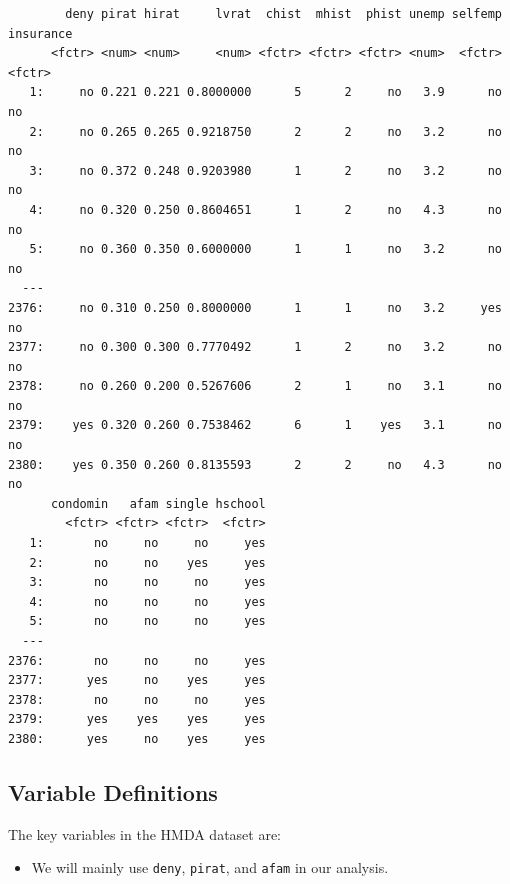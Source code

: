 \documentclass[
  12pt,
  letterpaper,
]{scrbook}
\providecommand{\tightlist}{%
  \setlength{\itemsep}{0pt}\setlength{\parskip}{0pt}}
\renewcommand{\tightlist}{\setlength{\itemsep}{0.5\baselineskip}\setlength{\parskip}{0.2\baselineskip}}
\theoremstyle{plain}
\theoremstyle{definition}
\theoremstyle{remark}
\begin{document}
\begin{verbatim}
        deny pirat hirat     lvrat  chist  mhist  phist unemp selfemp insurance
      <fctr> <num> <num>     <num> <fctr> <fctr> <fctr> <num>  <fctr>    <fctr>
   1:     no 0.221 0.221 0.8000000      5      2     no   3.9      no        no
   2:     no 0.265 0.265 0.9218750      2      2     no   3.2      no        no
   3:     no 0.372 0.248 0.9203980      1      2     no   3.2      no        no
   4:     no 0.320 0.250 0.8604651      1      2     no   4.3      no        no
   5:     no 0.360 0.350 0.6000000      1      1     no   3.2      no        no
  ---                                                                          
2376:     no 0.310 0.250 0.8000000      1      1     no   3.2     yes        no
2377:     no 0.300 0.300 0.7770492      1      2     no   3.2      no        no
2378:     no 0.260 0.200 0.5267606      2      1     no   3.1      no        no
2379:    yes 0.320 0.260 0.7538462      6      1    yes   3.1      no        no
2380:    yes 0.350 0.260 0.8135593      2      2     no   4.3      no        no
      condomin   afam single hschool
        <fctr> <fctr> <fctr>  <fctr>
   1:       no     no     no     yes
   2:       no     no    yes     yes
   3:       no     no     no     yes
   4:       no     no     no     yes
   5:       no     no     no     yes
  ---                               
2376:       no     no     no     yes
2377:      yes     no    yes     yes
2378:       no     no     no     yes
2379:      yes    yes    yes     yes
2380:      yes     no    yes     yes
\end{verbatim}

\subsection{Variable Definitions}\label{variable-definitions}

The key variables in the HMDA dataset are:

\begin{itemize}
\tightlist
\item
  We will mainly use \texttt{deny}, \texttt{pirat}, and \texttt{afam} in
  our analysis.
\end{itemize}
\end{document}
